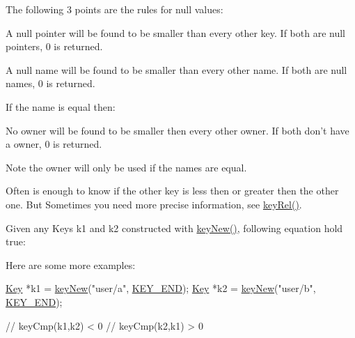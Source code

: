 The following 3 points are the rules for null values\-:


\begin{DoxyItemize}
\item A null pointer will be found to be smaller than every other key. If both are null pointers, 0 is returned.
\end{DoxyItemize}


\begin{DoxyItemize}
\item A null name will be found to be smaller than every other name. If both are null names, 0 is returned.
\end{DoxyItemize}

If the name is equal then\-:


\begin{DoxyItemize}
\item No owner will be found to be smaller then every other owner. If both don't have a owner, 0 is returned.
\end{DoxyItemize}

\begin{DoxyNote}{Note}
the owner will only be used if the names are equal.
\end{DoxyNote}
Often is enough to know if the other key is less then or greater then the other one. But Sometimes you need more precise information, see \hyperlink{group__keytest_ga6bb0f95ac34ce9c42d61bb35a76139d0}{key\-Rel()}.

Given any Keys k1 and k2 constructed with \hyperlink{group__key_gad23c65b44bf48d773759e1f9a4d43b89}{key\-New()}, following equation hold true\-:


\begin{DoxyCodeInclude}
\end{DoxyCodeInclude}
 Here are some more examples\-: 
\begin{DoxyCode}
\hyperlink{classkdb_1_1Key_a5679f5cae63caddd64a60388b9cc77fa}{Key} *k1 = \hyperlink{group__key_gad23c65b44bf48d773759e1f9a4d43b89}{keyNew}(\textcolor{stringliteral}{"user/a"}, \hyperlink{group__key_gga91fb3178848bd682000958089abbaf40aa8adb6fcb92dec58fb19410eacfdd403}{KEY\_END});
\hyperlink{classkdb_1_1Key_a5679f5cae63caddd64a60388b9cc77fa}{Key} *k2 = \hyperlink{group__key_gad23c65b44bf48d773759e1f9a4d43b89}{keyNew}(\textcolor{stringliteral}{"user/b"}, \hyperlink{group__key_gga91fb3178848bd682000958089abbaf40aa8adb6fcb92dec58fb19410eacfdd403}{KEY\_END});

\textcolor{comment}{// keyCmp(k1,k2) < 0}
\textcolor{comment}{// keyCmp(k2,k1) > 0}
\end{DoxyCode}


